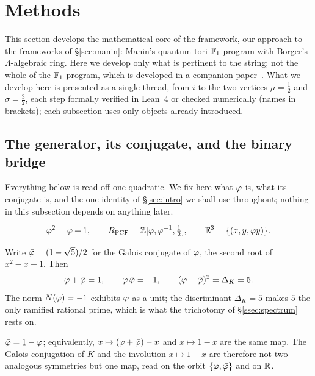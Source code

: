 \section{Methods}\label{sec:methods}

This section develops the mathematical core of the framework, our approach to the frameworks of \S\ref{sec:manin}: Manin's quantum tori $\mathbb{F}_1$ program with Borger's $\Lambda$-algebraic ring. Here we develop only what is pertinent to the string; not the whole of the $\mathbb{F}_1$ program, which is developed in a companion paper~\cite{F1}. What we develop here is presented as a single thread, from $i$ to the two vertices $\mu=\tfrac12$ and $\sigma=\tfrac32$,
each step formally verified in Lean~4 or checked numerically (names in brackets); each
subsection uses only objects already introduced.

\subsection{The generator, its conjugate, and the binary bridge}\label{ssec:generator}

Everything below is read off one quadratic. We fix here what $\varphi$ is, what its conjugate
is, and the one identity of \S\ref{sec:intro} we shall use throughout; nothing in this
subsection depends on anything later.

\begin{equation}\label{eq:base}
\varphi^2=\varphi+1,\qquad
R_{\mathrm{PCF}}=\mathbb{Z}[\varphi,\varphi^{-1},\tfrac12],\qquad
\mathbb{E}^3=\{(x,y,\varphi y)\}.
\end{equation}

\begin{definition}\label{def:K-arith}
Write $\bar{\varphi}=(1-\sqrt5)/2$ for the Galois conjugate of $\varphi$, the second root of
$x^{2}-x-1$. Then
\begin{equation}\label{eq:trace-norm}
  \varphi+\bar{\varphi}=1,
  \qquad
  \varphi\,\bar{\varphi}=-1,
  \qquad
  (\varphi-\bar{\varphi})^{2}=\Delta_K=5 .
\end{equation}
The norm $N(\varphi)=-1$ exhibits $\varphi$ as a unit; the discriminant $\Delta_K=5$ makes $5$
the only ramified rational prime, which is what the trichotomy of \S\ref{ssec:spectrum} rests on.

\end{definition}

\begin{lemma}\label{lem:galois-inv}
$\bar{\varphi}=1-\varphi$; equivalently, $x\mapsto(\varphi+\bar{\varphi})-x$ and $x\mapsto1-x$ are
the same map. The Galois conjugation of $K$ and the involution $x\mapsto1-x$ are therefore not
two analogous symmetries but one map, read on the orbit $\{\varphi,\bar{\varphi}\}$ and on $\mathbb{R}$.

\end{lemma}

